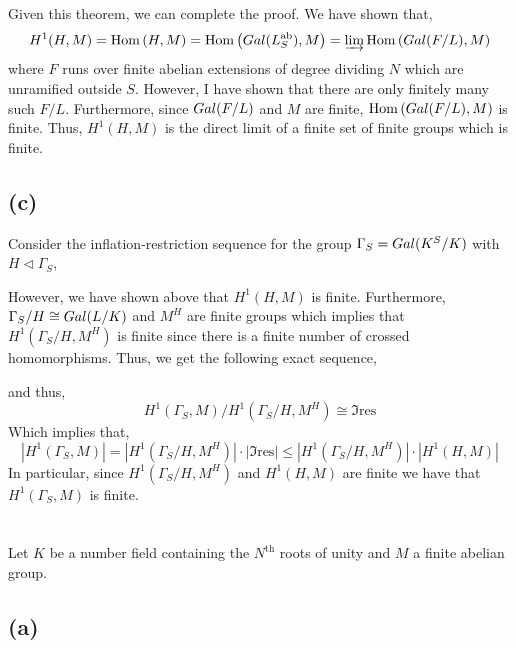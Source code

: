 \documentclass[12pt]{extarticle}
\begin{document}
\bigskip
\noindent
Given this theorem, we can complete the proof. We have shown that,
\[ H^1(H, M) = \mathrm{Hom}\left(H, M\right) = \mathrm{Hom}\left(Gal \small(L^{\mathrm{ab}}_S \small), M\right) = \varinjlim \mathrm{Hom}\left(Gal \small(F/L \small), M\right) \]
where $F$ runs over finite abelian extensions of degree dividing $N$ which are unramified outside $S$. However, I have shown that there are only finitely many such $F/L$. Furthermore, since $Gal \small(F/L \small)$ and $M$ are finite, $\mathrm{Hom}\left(Gal \small(F/L \small), M\right)$ is finite. Thus, $H^1(H, M)$ is the direct limit of a finite set of finite groups which is finite.  

\subsection*{(c)}

Consider the inflation-restriction sequence for the group $\Gamma_S = Gal \small(K^S/K \small)$ with $H \triangleleft \Gamma_S$,
\begin{center}
\end{center}
However, we have shown above that $H^1(H, M)$ is finite. Furthermore, $\Gamma_S/H \cong Gal \small(L/K \small)$ and $M^H$ are finite groups which implies that $H^1(\Gamma_S/H, M^H)$ is finite since there is a finite number of crossed homomorphisms. Thus, we get the following exact sequence,
\begin{center}
\end{center}
and thus,
\[ H^1(\Gamma_S, M) / H^1(\Gamma_S/H, M^H) \cong \Im{\mathrm{res}} \]
Which implies that,
\[ |H^1(\Gamma_S, M)| = |H^1(\Gamma_S/H, M^H)| \cdot | \Im{\mathrm{res}} | \le |H^1(\Gamma_S/H, M^H)| \cdot | H^1(H, M) | \]
In particular, since $H^1(\Gamma_S/H, M^H)$ and $H^1(H, M)$ are finite we have that $H^1(\Gamma_S, M)$ is finite.

\section{}

Let $K$ be a number field containing the $N^{\mathrm{th}}$ roots of unity and $M$ a finite abelian group.

\subsection*{(a)}
\end{document}
